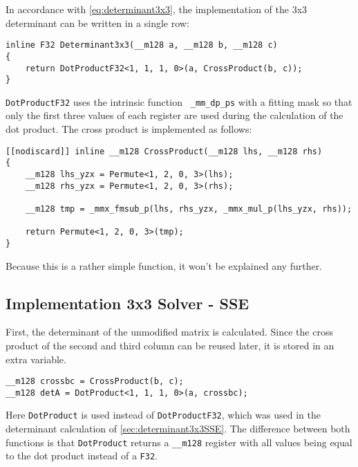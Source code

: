 In accordance with \cref{eq:determinant3x3}, the implementation of the 3x3 determinant can be written in a single row:

\begin{verbatim}
inline F32 Determinant3x3(__m128 a, __m128 b, __m128 c)
{
    return DotProductF32<1, 1, 1, 0>(a, CrossProduct(b, c));
}
\end{verbatim}

\texttt{DotProductF32} uses the intrinsic function \texttt{ _mm_dp_ps} with a fitting mask so that only the first three values of each register are used during the calculation of the dot product. 
The cross product is implemented as follows:

\begin{verbatim}
[[nodiscard]] inline __m128 CrossProduct(__m128 lhs, __m128 rhs)
{
    __m128 lhs_yzx = Permute<1, 2, 0, 3>(lhs);
    __m128 rhs_yzx = Permute<1, 2, 0, 3>(rhs);

    __m128 tmp = _mmx_fmsub_p(lhs, rhs_yzx, _mmx_mul_p(lhs_yzx, rhs));

    return Permute<1, 2, 0, 3>(tmp);
}
\end{verbatim}

Because this is a rather simple function, it won't be explained any further.



\newpage
\subsection{Implementation 3x3 Solver - SSE}
\label{sec:solver3x3SSE}

First, the determinant of the unmodified matrix is calculated. Since the cross product of the second and third column can be reused later, it is stored in an extra variable.

\begin{verbatim}
__m128 crossbc = CrossProduct(b, c);
__m128 detA = DotProduct<1, 1, 1, 0>(a, crossbc);
\end{verbatim}

Here \texttt{DotProduct} is used instead of \texttt{DotProductF32}, which was used in the determinant calculation of \cref{sec:determinant3x3SSE}. 
The difference between both functions is that \texttt{DotProduct} returns a \texttt{__m128} register with all values being equal to the dot product instead of a \texttt{F32}.


